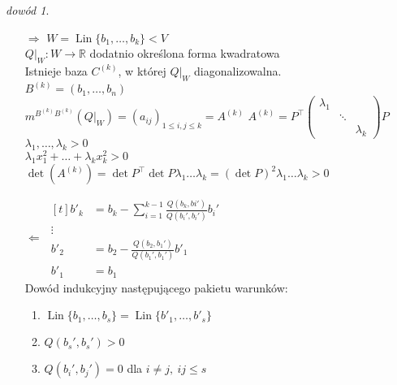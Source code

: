 \documentclass[10pt]{article}
\theoremstyle{definition}
\theoremstyle{definition}
\theoremstyle{definition}
\theoremstyle{definition}
\theoremstyle{remark}
\newtheorem*{dd}{dowód}
\theoremstyle{definition}
\theoremstyle{definition}
\theoremstyle{definition}
\theoremstyle{definition}
\theoremstyle{definition}
\begin{document}
\begin{dd} \hfill
    \begin{itemize} 
        \item[$\Rightarrow$]$W = \operatorname{Lin} \{b_1,\ldots,b_k\} < V$ \\ 
                            $Q|_W: W \to \mathbb R$ dodatnio określona forma kwadratowa\\
                            Istnieje baza $C^{(k)}$, w której $Q|_W$ diagonalizowalna. \\
                            $B^{(k)}=(b_1,\ldots,b_n)$ \\ 
                            $m^{B^{(k)}B^{(k)}}(Q|_W)=(a_{ij})_{1 \le i,j\le k}=A^{(k)}$
                            $A^{(k)} = P^\top 
                            \begin{pmatrix} \lambda_1 & & \\ & \ddots & \\ & & \lambda_k
                            \end{pmatrix} P$ \\ 
                            $\lambda_1, \ldots,\lambda_k > 0$ \\ 
                            $\lambda_1 x_1^2 + \ldots + \lambda_k x_k^2 > 0$  
                            $\det(A^{(k)}) = \det P^\top \det P \lambda_1\dots\lambda_k=
                            (\det P)^2 \lambda_1 \dots \lambda_k > 0$
        \item[$\Leftarrow$]$\begin{aligned}[t] 
                            b'_k &= b_k - \sum\limits_{i =1}^{k-1} \frac{Q(b_k,bi')}{Q(
                            b_i',b_i')} b_i'\\ 
                            \vdots \\
                            b'_2 &= b_2 - \frac{Q(b_2,b_1')}{Q(b_1',b_1')} b'_1 \\
                            b'_1 &= b_1
                            \end{aligned}$ \\ 
                            Dowód indukcyjny następującego pakietu warunków: 
                            \begin{enumerate}
                                \item $\operatorname{Lin}\{b_1,\ldots,b_s\} = 
                                       \operatorname{Lin}\{b'_1,\ldots,b'_s\}$ 
                                \item $Q(b_s',b_s') > 0$ 
                                \item $Q(b_i',b_j') = 0$ dla $i \neq j,\ i j \le s$

\end{enumerate}
\end{itemize}
\end{dd}
\end{document}

